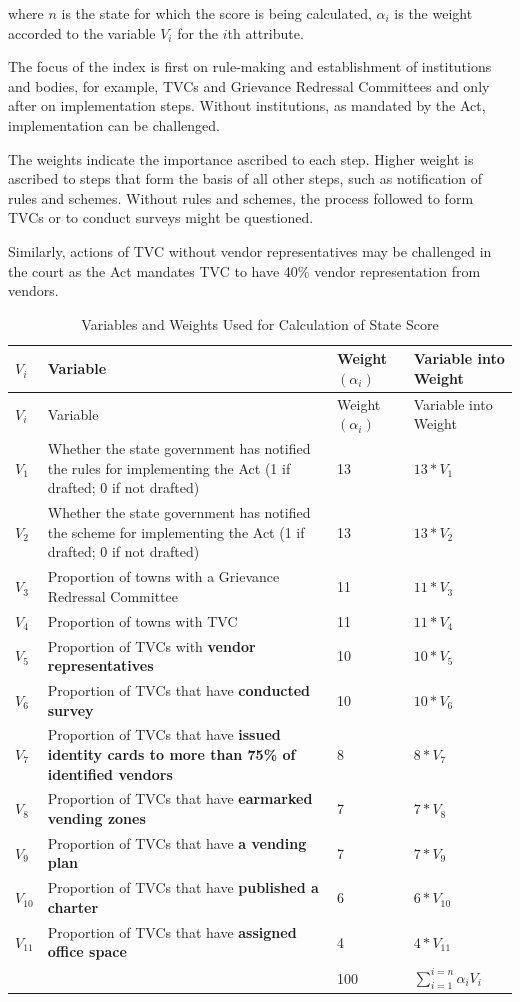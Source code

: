\documentclass[a4paper, 12pt, twoside]{article}
\begin{document}
{{where $n$ is the state for which the score is being calculated, $\alpha_i$ is the weight accorded to the variable $V_i$ for the $i$th attribute.

The focus of the index is first on rule-making and establishment of institutions and bodies, for example, TVCs and Grievance Redressal Committees and only after on implementation steps. Without institutions, as mandated by the Act, implementation can be challenged.

The weights indicate the importance ascribed to each step. Higher weight is ascribed to steps that form the basis of all other steps, such as notification of rules and schemes. Without rules and schemes, the process followed to form TVCs or to conduct surveys might be questioned.

Similarly, actions of TVC without vendor representatives may be challenged in the court as the Act mandates TVC to have 40\% vendor representation from vendors.

\begin{longtable}[l]{>{\raggedright}p{1.5cm}>{\raggedright}p{6cm}>{\raggedright}p{2.5cm}>{\raggedright\arraybackslash}p{4cm}}
  \caption{Variables and Weights Used for Calculation of State Score}\\
    \toprule
$V_i$ & Variable & Weight $(\alpha_i)$ & Variable into Weight \\
\midrule
\endfirsthead
$V_i$ & Variable & Weight $(\alpha_i)$ & Variable into Weight \\
\midrule
\endhead
\bottomrule
\endfoot
\bottomrule
\endlastfoot
$V_1$ & Whether the state government has notified the rules for implementing the Act (1 if drafted; 0 if not drafted) & 13 & $13 * V_1$\\
$V_2$ & Whether the state government has notified the scheme for implementing the Act (1 if drafted; 0 if not drafted) & 13 & $13 * V_2$\\
$V_3$ & Proportion of towns with a Grievance Redressal Committee & 11 & $11 * V_3$\\
$V_4$ & Proportion of towns with TVC & 11 & $11 * V_4$\\
$V_5$ & Proportion of TVCs with \textbf{vendor representatives} & 10 & $10 * V_5$\\
$V_6$ & Proportion of TVCs that have \textbf{conducted survey} & 10 & $10 * V_6$\\
$V_7$ & Proportion of TVCs that have \textbf{issued identity cards to more than 75\% of identified vendors} & 8 & $8 * V_7$\\
$V_8$ & Proportion of TVCs that have \textbf{earmarked vending zones} & 7 & $7 * V_8$\\
$V_9$ & Proportion of TVCs that have \textbf{a vending plan} & 7 & $7 * V_9$\\
$V_{10}$ & Proportion of TVCs that have \textbf{published a charter} & 6 & $6 * V_{10}$\\
$V_{11}$ & Proportion of TVCs that have \textbf{assigned office space} & 4 & $4 * V_{11}$\\
\midrule
& & 100 & $\sum_{i = 1}^{i = n} \alpha_i V_i$\\
\end{longtable}

}}
\end{document}

